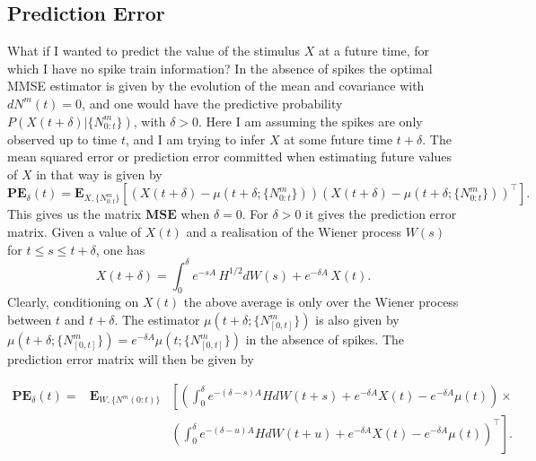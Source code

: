 \subsection{Prediction Error}
What if I wanted to predict the value of the stimulus $X$ at a future time, for which I have no spike train information? In the absence of spikes the optimal MMSE estimator is given by 
the evolution of the mean and covariance with $dN^m(t) = 0$, and one would have the predictive probability
$P(X({t+\delta})|\{N^m_{0:t}\})$, with $\delta>0$. Here I am assuming the spikes are only observed up to time $t$, and I am trying to infer $X$ at some future time $t+\delta$.
The mean squared error or prediction error committed when estimating future values of $X$ in that way is given by
\begin{equation}
\boldsymbol{PE}_\delta(t) = \boldsymbol{E}_{X,\{N^m_{0:t}\}}\left[\left(X(t+\delta)-\mu(t+\delta;\{N^m_{0:t}\})\right)\left(X(t+\delta)-\mu(t+\delta;\{N^m_{0:t}\})\right)^\top\right].
\label{eq:C_delta}
\end{equation}
This gives us the matrix $\boldsymbol{MSE}$ when $\delta= 0$. For $\delta>0$ it gives the prediction error matrix.
Given a value of $X(t)$ and a realisation of the Wiener process $W(s)$ for $t\leq s \leq t+\delta$, one has
\[
X(t+\delta) = \int_0^{\delta} e^{-s A} \,H^{1/2} d W(s) + e^{-\delta A}\,X(t).
\]
Clearly, conditioning on $X(t)$ the above average is only over the Wiener process between $t$ and $t+\delta$. The estimator $\mu(t+\delta;\{N^m_{[0,t]}\})$ is also given by $\mu(t+\delta;\{N^m_{[0,t]}\}) = e^{-\delta A} \mu(t;\{N^m_{[0,t]}\})$ in the absence of spikes. The prediction error matrix will then be given by

\begin{eqnarray}
\boldsymbol{PE}_\delta(t)  =& \boldsymbol{E}_{W,\{N^m(0:t)\}}&\left[( \int_0^{\delta} e^{-(\delta-s)A} H d W(t+s) + e^{-\delta A}X(t)-e^{-\delta A}\mu(t))\times\right.\nonumber
\\
&&\left. (\int_0^{\delta} e^{-(\delta-u)A} H d W(t+u) + e^{-\delta A}X(t)-e^{-\delta A}\mu(t))^\top \right].\nonumber
\end{eqnarray}

